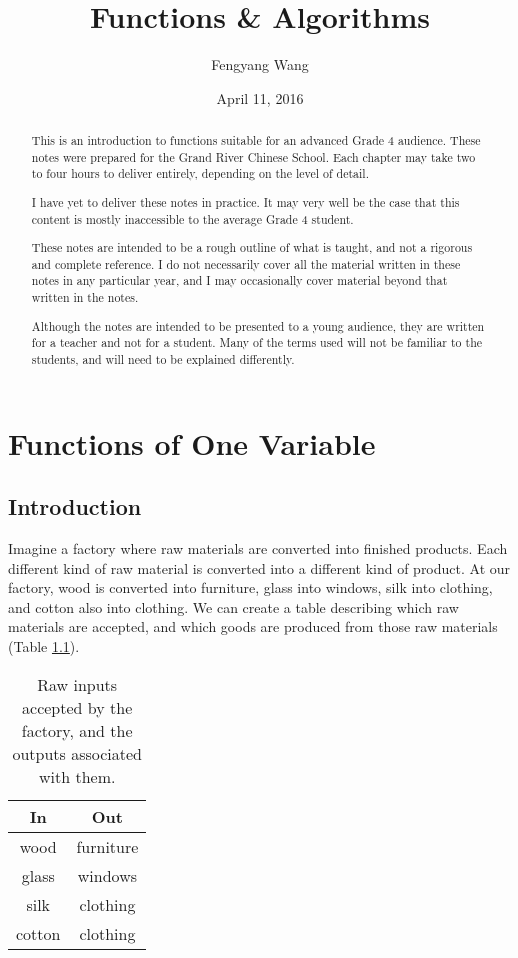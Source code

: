 \documentclass[a4paper,10pt]{report}
\title{Functions \& Algorithms}
\author{Fengyang Wang}
\date{April 11, 2016}
\begin{document}
\begin{abstract}

 This is an introduction to functions suitable for an advanced Grade 4 audience.
 These notes were prepared for the Grand River Chinese School. Each chapter may
 take two to four hours to deliver entirely, depending on the level of detail.

 I have yet to deliver these notes in practice. It may very well be the case
 that this content is mostly inaccessible to the average Grade 4 student.

 These notes are intended to be a rough outline of what is taught, and not a
 rigorous and complete reference. I do not necessarily cover all the material
 written in these notes in any particular year, and I may occasionally cover
 material beyond that written in the notes.

 Although the notes are intended to be presented to a young audience, they are
 written for a teacher and not for a student. Many of the terms used will not be
 familiar to the students, and will need to be explained differently.

\end{abstract}

\maketitle

\tableofcontents

\chapter{Functions of One Variable}

\section{Introduction}

Imagine a factory where raw materials are converted into finished products. Each
different kind of raw material is converted into a different kind of product. At
our factory, wood is converted into furniture, glass into windows, silk into
clothing, and cotton also into clothing. We can create a table describing which
raw materials are accepted, and which goods are produced from those raw
materials (Table \ref{fov:factory}).

\begin{table}
 \renewcommand{\arraystretch}{1.2}
 \begin{tabular}{|c|c|}
  \hline
  \textbf{In} & \textbf{Out} \\
  \hline
  wood & furniture \\
  glass & windows \\
  silk & clothing \\
  cotton & clothing \\
  \hline
 \end{tabular}

 \caption{Raw inputs accepted by the factory, and the outputs associated with
 them.}
 \label{fov:factory}
\end{table}
\end{document}
